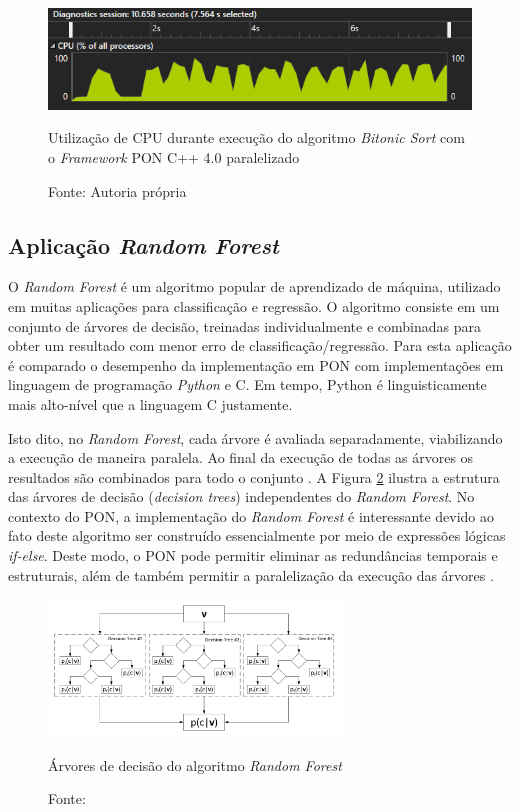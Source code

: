 \begin{figure}[!htb]
\centering
\includegraphics[width=\textwidth]{../figures/cpu_bitonic_par.png}
\smallskip
\caption{Utilização de CPU durante execução do algoritmo \textit{Bitonic Sort}
com o \textit{Framework} PON C++ 4.0 paralelizado}
\caption*{Fonte: Autoria própria}
\label{fig:bit_cpu_par}
\end{figure}

\subsection{Aplicação \textit{Random Forest}}\label{sec:random_forest}

O \textit{Random Forest} é um algoritmo popular de aprendizado de máquina,
utilizado em muitas aplicações para classificação e regressão. O algoritmo
consiste em um conjunto de árvores de decisão, treinadas individualmente e
combinadas para obter um resultado com menor erro de classificação/regressão.
Para esta aplicação é comparado o desempenho da implementação em PON com
implementações em linguagem de programação \textit{Python} e C. Em tempo, Python
é linguisticamente mais alto-nível que a linguagem C justamente.

Isto dito, no \textit{Random Forest}, cada árvore é avaliada separadamente,
viabilizando a execução de maneira paralela. Ao final da execução de todas as
árvores os resultados são combinados para todo o conjunto \cite{criminisi_2011}.
A Figura \ref{fig:random_forest} ilustra a estrutura das árvores de decisão
(\textit{decision trees}) independentes do \textit{Random Forest}. No contexto
do PON, a implementação do \textit{Random Forest} é interessante devido ao fato
deste algoritmo ser construído essencialmente por meio de expressões lógicas
\textit{if-else}. Deste modo, o PON pode permitir eliminar as redundâncias
temporais e estruturais, além de também permitir a paralelização da execução das
árvores \cite{quali_pordeus_2020}.

\begin{figure}[!htb]
  \centering
  \includegraphics[width=0.7\textwidth]{../figures/random_forest.png}
  \smallskip
  \caption{Árvores de decisão do algoritmo \textit{Random Forest}}
  \caption*{Fonte: }
  \label{fig:random_forest}
  \end{figure}

